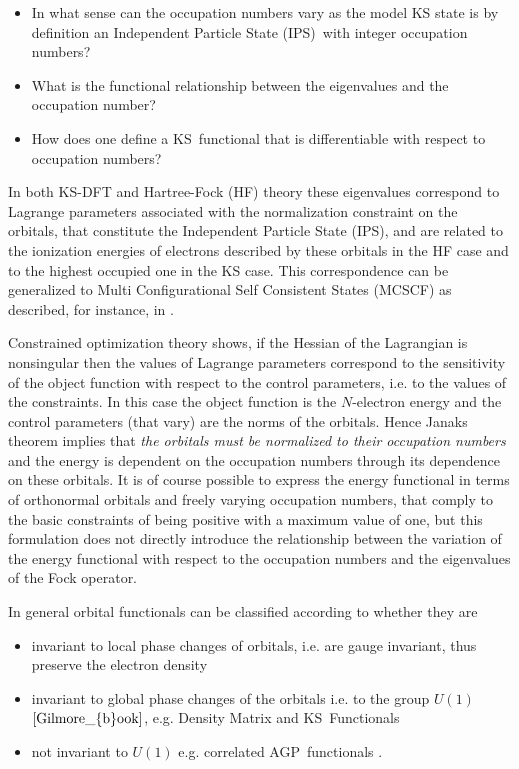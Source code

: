 \documentclass[aps,preprint]{revtex4}%
\begin{document}
\begin{itemize}
\item In what sense can the occupation numbers vary as the model KS state is
by definition an Independent Particle State (IPS)\ with integer occupation numbers?

\item What is the functional relationship between the eigenvalues and the
occupation number?

\item How does one define a KS\ functional that is differentiable with respect
to occupation numbers?
\end{itemize}

In both KS-DFT and Hartree-Fock (HF) theory these eigenvalues correspond to
Lagrange parameters associated with the normalization constraint on the
orbitals, that constitute the Independent Particle State (IPS), and are
related to the ionization energies of electrons described by\textit{ }these
orbitals in the HF case and to the highest occupied one in the KS case. This
correspondence can be generalized to Multi Configurational Self Consistent
States (MCSCF) as described, for instance, in \cite{OrtizWeiner2006}.

Constrained optimization theory \cite{Hestenes75} shows, if the Hessian of the
Lagrangian is nonsingular then the values of Lagrange parameters correspond to
the sensitivity of the object function with respect to the control parameters,
i.e. to the values of the constraints. In this case the object function is the
$N$-electron energy and the control parameters (that vary) are the norms of
the orbitals. Hence Janaks theorem implies that\emph{ the orbitals must be
normalized to their occupation numbers }and the energy is dependent on the
occupation numbers through its dependence on these orbitals. It is of course
possible to express the energy functional in terms of orthonormal orbitals and
freely varying occupation numbers, that comply to the basic constraints of
being positive with a maximum value of one, but this formulation does not
directly introduce the relationship between the variation of the energy
functional with respect to the occupation numbers and the eigenvalues of the
Fock operator.

In general orbital functionals can be classified according to whether they are

\begin{itemize}
\item invariant to local phase changes of orbitals, i.e. are gauge invariant,
thus preserve the electron density

\item invariant to global phase changes of the orbitals i.e. to the group
$U\left(  1\right)  $ $\cite{Gilmore_{b}ook}$, e.g. Density Matrix and KS\ Functionals

\item not invariant to $U\left(  1\right)  $ e.g. correlated AGP\ functionals
\cite{OrtizWeiner2006}.
\end{itemize}
\end{document}
